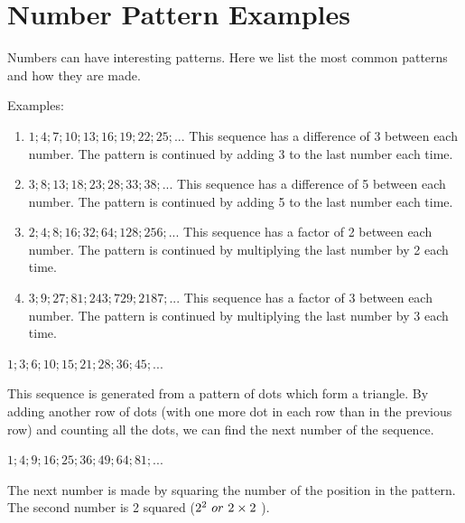             \section{Number Pattern Examples}
            \nopagebreak
            \label{m39364*id62635}Numbers can have interesting patterns. Here we list the most common patterns and how they are made.\par 
      \label{m39364*id62640}Examples:\par 
      \label{m39364*id62643}\begin{enumerate}[noitemsep, label=\textbf{\arabic*}. ] 
            \label{m39364*uid5}\item $1;4;7;10;13;16;19;22;25;...$
This sequence has a difference of 3 between each number.
The pattern is continued by adding 3 to the last number each time.
\label{m39364*uid6}\item $3;8;13;18;23;28;33;38;...$
This sequence has a difference of 5 between each number.
The pattern is continued by adding 5 to the last number each time.
\label{m39364*uid7}\item $2;4;8;16;32;64;128;256;...$
This sequence has a factor of 2 between each number.
The pattern is continued by multiplying the last number by 2 each time.
\label{m39364*uid8}\item $3;9;27;81;243;729;2187;...$
This sequence has a factor of 3 between each number.
The pattern is continued by multiplying the last number by 3 each time.
\end{enumerate}
      \label{m39364*uid9}
            \nopagebreak
            \label{m39364*uid10}
            \nopagebreak
          \label{m39364*id62915}
            $1;3;6;10;15;21;28;36;45;...$
          \par 
          \label{m39364*id62968}This sequence is generated from a pattern of dots which form a triangle.
By adding another row of dots (with one more dot in each row than in the previous row) and counting all the dots, we can find the next number of the sequence.\par 
        \label{m39364*uid11}
            \nopagebreak
          \label{m39364*id62984}
            $1;4;9;16;25;36;49;64;81;...$
          \par 
          \label{m39364*id63037}The next number is made by squaring the number of the position in the pattern.
The second number is 2 squared (${2}^{2}\phantom{\rule{3.33333pt}{0ex}}or\phantom{\rule{3.33333pt}{0ex}}2\ensuremath{\times}2$ \hspace{1ex}). 
